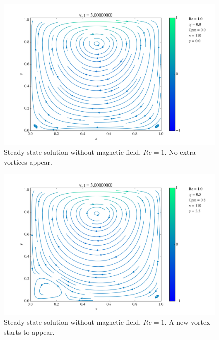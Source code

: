 \documentclass[journal]{IEEEtran}
\begin{document}
\begin{figure}[!t]
\centering
\includegraphics[width=\linewidth]{figures/Re001/n/vectorField}
\caption{Steady state solution without magnetic field, $\mathit{Re}=1$. No extra vortices appear.\label{Re001nVectorField}}
\end{figure}

\begin{figure}[!t]
\centering
\includegraphics[width=\linewidth]{figures/Re001/w/vectorField}
\caption{Steady state solution without magnetic field, $\mathit{Re}=1$. A new vortex starts to appear. \label{Re001wVectorField}}
\end{figure}
\end{document}
